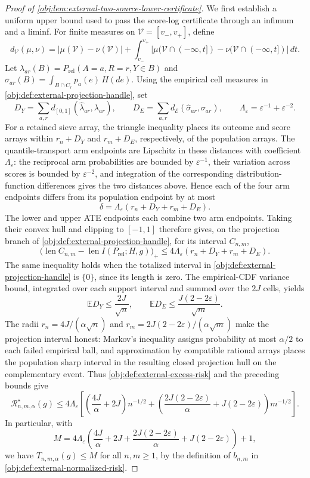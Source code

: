 \begin{proof}[Proof of \cref{obj:lem:external-two-source-lower-certificate}]
We first establish a uniform upper bound used to pass the score-log certificate through an infimum and a liminf. For finite measures on \(\mathcal V=[v_-,v_+]\), define
\[
d_{\mathcal V}(\mu,\nu)
=|\mu(\mathcal V)-\nu(\mathcal V)|
 +\int_{v_-}^{v_+}
   |\mu(\mathcal V\cap(-\infty,t])-\nu(\mathcal V\cap(-\infty,t])|\,dt.
\]
Let \(\lambda_{ar}(B)=P_{\mathrm{rel}}(A=a,R=r,Y\in B)\) and
\(\sigma_{ar}(B)=\int_{B\cap C_r}p_a(e)\,H(de)\). Using the empirical cell measures in \cref{obj:def:external-projection-handle}, set
\[
D_Y=\sum_{a,r}d_{[0,1]}(\widehat\lambda_{ar},\lambda_{ar}),
\qquad
D_E=\sum_{a,r}d_{\mathcal E}(\widehat\sigma_{ar},\sigma_{ar}),
\qquad
\Lambda_\varepsilon=\varepsilon^{-1}+\varepsilon^{-2}.
\]
For a retained sieve array, the triangle inequality places its outcome and score arrays within \(r_n+D_Y\) and \(r_m+D_E\), respectively, of the population arrays. The quantile-transport arm endpoints are Lipschitz in these distances with coefficient \(\Lambda_\varepsilon\): the reciprocal arm probabilities are bounded by \(\varepsilon^{-1}\), their variation across scores is bounded by \(\varepsilon^{-2}\), and integration of the corresponding distribution-function differences gives the two distances above. Hence each of the four arm endpoints differs from its population endpoint by at most
\[
\delta=\Lambda_\varepsilon(r_n+D_Y+r_m+D_E).
\]
The lower and upper ATE endpoints each combine two arm endpoints. Taking their convex hull and clipping to \([-1,1]\) therefore gives, on the projection branch of \cref{obj:def:external-projection-handle}, for its interval \(C_{n,m}\),
\[
\bigl(\operatorname{len}C_{n,m}
       -\operatorname{len}I(P_{\mathrm{rel}};H,g)\bigr)_+
\le 4\Lambda_\varepsilon(r_n+D_Y+r_m+D_E).
\]
The same inequality holds when the totalized interval in \cref{obj:def:external-projection-handle} is \(\{0\}\), since its length is zero. The empirical-CDF variance bound, integrated over each support interval and summed over the \(2J\) cells, yields
\[
\mathbb E D_Y\le\frac{2J}{\sqrt n},
\qquad
\mathbb E D_E\le\frac{J(2-2\varepsilon)}{\sqrt m}.
\]
The radii \(r_n=4J/(\alpha\sqrt n)\) and
\(r_m=2J(2-2\varepsilon)/(\alpha\sqrt m)\) make the projection interval honest: Markov’s inequality assigns probability at most \(\alpha/2\) to each failed empirical ball, and approximation by compatible rational arrays places the population sharp interval in the resulting closed projection hull on the complementary event. Thus \cref{obj:def:external-excess-risk} and the preceding bounds give
\[
\mathcal R^\star_{n,m,\alpha}(g)
\le 4\Lambda_\varepsilon
\left[
 \left(\frac{4J}{\alpha}+2J\right)n^{-1/2}
 +\left(\frac{2J(2-2\varepsilon)}{\alpha}
          +J(2-2\varepsilon)\right)m^{-1/2}
\right].
\]
In particular, with
\[
M=4\Lambda_\varepsilon
\left(\frac{4J}{\alpha}+2J+
      \frac{2J(2-2\varepsilon)}{\alpha}
      +J(2-2\varepsilon)\right)+1,
\]
we have \(T_{n,m,\alpha}(g)\le M\) for all \(n,m\ge1\), by the definition of \(b_{n,m}\) in \cref{obj:def:external-normalized-risk}.


\end{proof}
